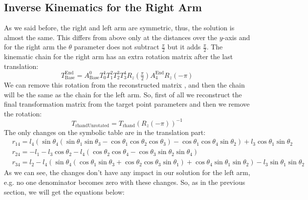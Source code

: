 \subsection{Inverse Kinematics for the Right Arm}
As we said before, the right and left arm are symmetric, thus, the solution is almost the same. This differs from above only at the distances over the $y$-axis and for the right arm the $\theta$ parameter does not subtract $\frac{\pi}{2}$ but it adds $\frac{\pi}{2}$. The kinematic chain for the right arm has an extra rotation matrix after the last translation:
\[
T^\text{End}_\text{Base} = A^0_\text{Base}T^1_0T^2_1T^3_2T^4_3R_z(\tfrac{\pi}{2})A^\text{End}_{4}R_z(-\pi)
\]
We can remove this rotation from the reconstructed matrix , and then the chain will be the same as the chain for the left arm. So, first of all we reconstruct the final transformation matrix from the target point parameters and then we remove the rotation:
\[
T_\text{rhandUnrotated} = T_\text{rhand}{\left(R_z(-\pi)\right)}^{-1}
\]
The only changes on the symbolic table are in the translation part:
\begin{align*}
&r_{14} = l_4\left(\sin\theta_4\left(\sin\theta_1\sin\theta_3 - \cos\theta_1\cos\theta_2\cos\theta_3\right) - \cos\theta_1\cos\theta_4\sin\theta_2\right) + l_3\cos\theta_1\sin\theta_2\\
&r_{24} = -l_1 - l_3\cos\theta_2 - l_4\left(\cos\theta_2\cos\theta_4 - \cos\theta_3\sin\theta_2\sin\theta_4\right)\\
&r_{34} = l_2 - l_4\left(\sin\theta_4\left(\cos\theta_1\sin\theta_3 + \cos\theta_2\cos\theta_3\sin\theta_1\right) + \cos\theta_4\sin\theta_1\sin\theta_2\right) - l_3\sin\theta_1\sin\theta_2
\end{align*}
As we can see, the changes don't have any impact in our solution for the left arm, e.g. no one denominator becomes zero with these changes. So, as in the previous section, we will get the equations below:
